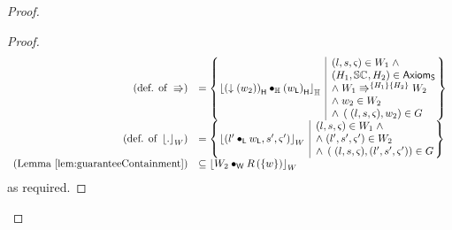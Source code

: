 \begin{lemma}
\begin{proof}
\begin{proof}
\[\begin{array}{r l}
	
	
	\left(\text{def. of } \Rrightarrow \right)
	& =
	\left\{
	\hspace*{-0.15cm}
	\begin{array}{l | l}
		\reifyH{ \heapPart{\left(\collapseW{w_2}\right)}  \composeH \heapPart{\left(\localPart{w}\right)}}
		&
		\hspace*{-0.15cm}
		\begin{array}{l}
			(l, s, \amod{}) \in W_1 \;\land\\ 
			(H_1, \seq{}, H_2) \in \AxiomsSeq \\
			\land\;\repartitions{W_1}{W_2}{H_1}{H_2}\\
			\land\; w_2 \in W_2\\
			\land\; \left(\;(l, s, \amod{}), w_2 \right) \in \guarantee
		\end{array}			
		\hspace*{-0.15cm}
	\end{array}
	\hspace*{-0.15cm}
	\right\}\\
	
	
	
	\left(\text{def. of } \reifyW{.} \right)
	& =
	\left\{
	\hspace*{-0.15cm}
	\begin{array}{l | l}
		\reifyW{\left(l' \composeL \localPart{w}, s', \amod{}' \right)}
		&
		\hspace*{-0.15cm}
		\begin{array}{l}
			(l, s, \amod{}) \in W_1 \;\land\\ 
			\land\;(l', s', \amod{}') \in W_2\\
			\land\; \left(\;(l, s, \amod{}), (l', s', \amod{}') \right) \in \guarantee
		\end{array}			
		\hspace*{-0.15cm}
	\end{array}
	\hspace*{-0.15cm}
	\right\}\\
	
	
	
	\left(\text{Lemma } \ref{lem:guaranteeContainment} \right)
	& 
	\subseteq	\reifyW{W_2 \composeW \rely\left( \{w\} \right)}

	
\end{array}
\]
%
as required.
\end{proof}
\renewcommand{\qed}{}
\end{proof}
\end{lemma}
